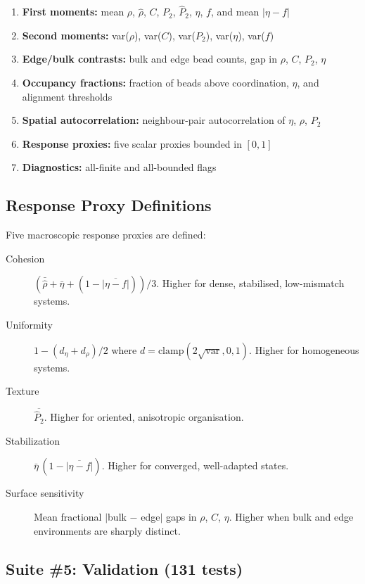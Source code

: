\documentclass[11pt]{article}
\begin{document}
\begin{enumerate}[label=(\Alph*)]
    \item \textbf{First moments:} mean $\rho$, $\hat{\rho}$, $C$,
          $P_2$, $\hat{P}_2$, $\eta$, $f$, and mean $|\eta - f|$
    \item \textbf{Second moments:} var($\rho$), var($C$), var($P_2$),
          var($\eta$), var($f$)
    \item \textbf{Edge/bulk contrasts:} bulk and edge bead counts,
          gap in $\rho$, $C$, $P_2$, $\eta$
    \item \textbf{Occupancy fractions:} fraction of beads above
          coordination, $\eta$, and alignment thresholds
    \item \textbf{Spatial autocorrelation:} neighbour-pair
          autocorrelation of $\eta$, $\rho$, $P_2$
    \item \textbf{Response proxies:} five scalar proxies bounded
          in $[0, 1]$
    \item \textbf{Diagnostics:} all-finite and all-bounded flags
\end{enumerate}

\subsection{Response Proxy Definitions}

Five macroscopic response proxies are defined:

\begin{description}
    \item[Cohesion] $(\bar{\hat{\rho}} + \bar{\eta}
        + (1 - \overline{|\eta - f|})) / 3$.
        Higher for dense, stabilised, low-mismatch systems.
    \item[Uniformity] $1 - (d_\eta + d_\rho) / 2$ where
        $d = \mathrm{clamp}(2\sqrt{\mathrm{var}}, 0, 1)$.
        Higher for homogeneous systems.
    \item[Texture] $\overline{\hat{P}_2}$.
        Higher for oriented, anisotropic organisation.
    \item[Stabilization] $\bar{\eta}\,(1 - \overline{|\eta - f|})$.
        Higher for converged, well-adapted states.
    \item[Surface sensitivity] Mean fractional $|$bulk $-$ edge$|$
        gaps in $\rho$, $C$, $\eta$.
        Higher when bulk and edge environments are sharply distinct.
\end{description}

\subsection{Suite \#5: Validation (131 tests)}
\end{document}
